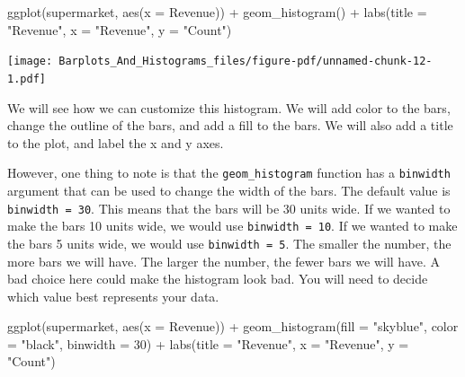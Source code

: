 \documentclass[
  letterpaper,
  DIV=11,
  numbers=noendperiod]{scrreprt}
\newenvironment{Shaded}{\begin{snugshade}}{\end{snugshade}}
\newcommand{\AttributeTok}[1]{\textcolor[rgb]{0.40,0.45,0.13}{#1}}
\newcommand{\DecValTok}[1]{\textcolor[rgb]{0.68,0.00,0.00}{#1}}
\newcommand{\FunctionTok}[1]{\textcolor[rgb]{0.28,0.35,0.67}{#1}}
\newcommand{\NormalTok}[1]{\textcolor[rgb]{0.00,0.23,0.31}{#1}}
\newcommand{\SpecialCharTok}[1]{\textcolor[rgb]{0.37,0.37,0.37}{#1}}
\newcommand{\StringTok}[1]{\textcolor[rgb]{0.13,0.47,0.30}{#1}}
\begin{document}
\begin{Shaded}
\begin{Highlighting}[]
\FunctionTok{ggplot}\NormalTok{(supermarket, }\FunctionTok{aes}\NormalTok{(}\AttributeTok{x =} \StringTok{\textasciigrave{}}\AttributeTok{Revenue}\StringTok{\textasciigrave{}}\NormalTok{)) }\SpecialCharTok{+}
  \FunctionTok{geom\_histogram}\NormalTok{() }\SpecialCharTok{+}
  \FunctionTok{labs}\NormalTok{(}\AttributeTok{title =} \StringTok{"Revenue"}\NormalTok{,}
       \AttributeTok{x =} \StringTok{"Revenue"}\NormalTok{,}
       \AttributeTok{y =} \StringTok{"Count"}\NormalTok{)}
\end{Highlighting}
\end{Shaded}

\texttt{[image: Barplots\_And\_Histograms\_files/figure-pdf/unnamed-chunk-12-1.pdf]}

We will see how we can customize this histogram. We will add color to
the bars, change the outline of the bars, and add a fill to the bars. We
will also add a title to the plot, and label the x and y axes.

However, one thing to note is that the \texttt{geom\_histogram} function
has a \texttt{binwidth} argument that can be used to change the width of
the bars. The default value is \texttt{binwidth\ =\ 30}. This means that
the bars will be 30 units wide. If we wanted to make the bars 10 units
wide, we would use \texttt{binwidth\ =\ 10}. If we wanted to make the
bars 5 units wide, we would use \texttt{binwidth\ =\ 5}. The smaller the
number, the more bars we will have. The larger the number, the fewer
bars we will have. A bad choice here could make the histogram look bad.
You will need to decide which value best represents your data.

\begin{Shaded}
\begin{Highlighting}[]
\FunctionTok{ggplot}\NormalTok{(supermarket, }\FunctionTok{aes}\NormalTok{(}\AttributeTok{x =} \StringTok{\textasciigrave{}}\AttributeTok{Revenue}\StringTok{\textasciigrave{}}\NormalTok{)) }\SpecialCharTok{+}
  \FunctionTok{geom\_histogram}\NormalTok{(}\AttributeTok{fill =} \StringTok{"skyblue"}\NormalTok{, }\AttributeTok{color =} \StringTok{"black"}\NormalTok{, }\AttributeTok{binwidth =} \DecValTok{30}\NormalTok{) }\SpecialCharTok{+}
  \FunctionTok{labs}\NormalTok{(}\AttributeTok{title =} \StringTok{"Revenue"}\NormalTok{,}
       \AttributeTok{x =} \StringTok{"Revenue"}\NormalTok{,}
       \AttributeTok{y =} \StringTok{"Count"}\NormalTok{)}
\end{Highlighting}
\end{Shaded}
\end{document}
